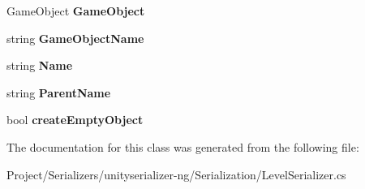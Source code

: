 \begin{DoxyCompactItemize}
$$Game\+Object {\bfseries Game\+Object}
\item 
\mbox{\label{class_level_serializer_1_1_stored_item_a0bfa4d10f7052e85482263c52b59d27f}} 
string {\bfseries Game\+Object\+Name}
\item 
\mbox{\label{class_level_serializer_1_1_stored_item_a57583ec11cfdd15e16642457b048a7dd}} 
string {\bfseries Name}
\item 
\mbox{\label{class_level_serializer_1_1_stored_item_a15d8e7cfb62fb7d41e76a8c2e48fc7f8}} 
string {\bfseries Parent\+Name}
\item 
\mbox{\label{class_level_serializer_1_1_stored_item_ab87d9042b34abde7e13d53f0984212c1}} 
bool {\bfseries create\+Empty\+Object}
\end{DoxyCompactItemize}


The documentation for this class was generated from the following file\+:\begin{DoxyCompactItemize}
\item 
Project/\+Serializers/unityserializer-\/ng/\+Serialization/Level\+Serializer.\+cs\end{DoxyCompactItemize}

